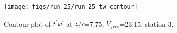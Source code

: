 \begin{figure}[H]
\centering
\texttt{[image: figs/run\_25/run\_25\_tw\_contour]}
\caption{Contour plot of $\overline{t^\prime w^\prime}$ at $z/c$=7.75, $V_{free}$=23.15, station 3.}
\label{fig:run_25_tw_contour}
\end{figure}


